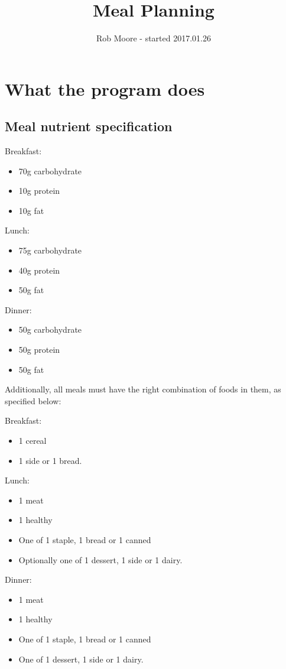 \documentclass[a4paper]{article}
\title{Meal Planning}
\author{Rob Moore - started 2017.01.26}
\begin{document}
\maketitle

\section{What the program does}

\subsection{Meal nutrient specification}

Breakfast:
\begin{itemize}
  \item 70g carbohydrate
  \item 10g protein
  \item 10g fat
\end{itemize}

Lunch:
\begin{itemize}
  \item 75g carbohydrate
  \item 40g protein
  \item 50g fat
\end{itemize}

Dinner:
\begin{itemize}
  \item 50g carbohydrate
  \item 50g protein
  \item 50g fat
\end{itemize}

Additionally, all meals must have the right combination of foods in them, as 
specified below:


Breakfast:
\begin{itemize}
  \item 1 cereal 
  \item 1 side or 1 bread.
\end{itemize}

Lunch:
\begin{itemize}
  \item 1 meat
  \item 1 healthy
  \item One of 1 staple, 1 bread or 1 canned 
  \item Optionally one of 1 dessert, 1 side or 1 dairy.
\end{itemize}

Dinner:
\begin{itemize}
  \item 1 meat
  \item 1 healthy
  \item One of 1 staple, 1 bread or 1 canned 
  \item One of 1 dessert, 1 side or 1 dairy.
\end{itemize}
\end{document}
